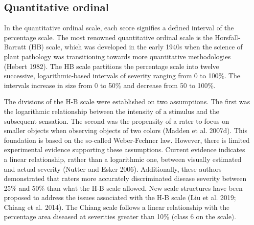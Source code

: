 \documentclass[
  letterpaper,
]{book}
\begin{document}
\hypertarget{quantitative-ordinal}{%
\subsection{Quantitative ordinal}\label{quantitative-ordinal}}

In the quantitative ordinal scale, each score signifies a defined
interval of the percentage scale. The most renowned quantitative ordinal
scale is the Horsfall-Barratt (HB) scale, which was developed in the
early 1940s when the science of plant pathology was transitioning
towards more quantitative methodologies (Hebert 1982). The HB scale
partitions the percentage scale into twelve successive,
logarithmic-based intervals of severity ranging from 0 to 100\%. The
intervals increase in size from 0 to 50\% and decrease from 50 to 100\%.

\begin{tcolorbox}[enhanced jigsaw, coltitle=black, colbacktitle=quarto-callout-warning-color!10!white, colframe=quarto-callout-warning-color-frame, title=\textcolor{quarto-callout-warning-color}{\faExclamationTriangle}\hspace{0.5em}{Controversy of the H-B scale}, arc=.35mm, bottomrule=.15mm, breakable, opacitybacktitle=0.6, toptitle=1mm, titlerule=0mm, bottomtitle=1mm, rightrule=.15mm, opacityback=0, leftrule=.75mm, colback=white, toprule=.15mm, left=2mm]

The divisions of the H-B scale were established on two assumptions. The
first was the logarithmic relationship between the intensity of a
stimulus and the subsequent sensation. The second was the propensity of
a rater to focus on smaller objects when observing objects of two colors
(Madden et al. 2007d). This foundation is based on the so-called
Weber-Fechner law. However, there is limited experimental evidence
supporting these assumptions. Current evidence indicates a linear
relationship, rather than a logarithmic one, between visually estimated
and actual severity (Nutter and Esker 2006). Additionally, these authors
demonstrated that raters more accurately discriminated disease severity
between 25\% and 50\% than what the H-B scale allowed. New scale
structures have been proposed to address the issues associated with the
H-B scale (Liu et al. 2019; Chiang et al. 2014). The Chiang scale
follows a linear relationship with the percentage area diseased at
severities greater than 10\% (class 6 on the scale).

\end{tcolorbox}
\end{document}
